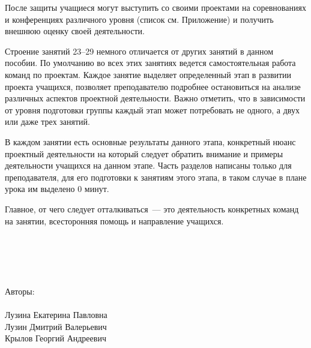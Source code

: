После защиты учащиеся могут выступить со своими проектами на соревнованиях и конференциях различного уровня  (список см. Приложение) и получить внешнюю оценку своей деятельности.

Строение занятий 23--29 немного отличается от других занятий в данном пособии. По умолчанию во всех этих занятиях ведется самостоятельная работа команд по проектам. Каждое занятие выделяет определенный этап в развитии проекта учащихся, позволяет преподавателю подробнее остановиться на анализе различных аспектов проектной деятельности. Важно отметить, что в зависимости от уровня подготовки группы каждый этап может потребовать не одного, а двух или даже трех занятий. 

В каждом занятии есть основные результаты данного этапа, конкретный нюанс проектный деятельности на который следует обратить внимание и примеры деятельности учащихся на данном этапе. Часть разделов написаны только  для преподавателя, для его подготовки к занятиям этого этапа,  в таком случае в плане урока им выделено 0 минут. 

Главное, от чего следует отталкиваться~--- это деятельность конкретных команд на занятии, всесторонняя помощь и направление учащихся.\\\\
~\\\\
~\\\\
\noindent Авторы:\\\\
\indent Лузина Екатерина Павловна\\
\indent Лузин Дмитрий Валерьевич\\
\indent Крылов Георгий Андреевич\\